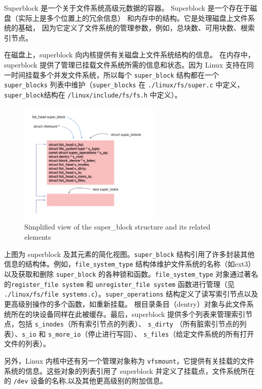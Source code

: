 \documentclass[UTF8,a4paper]{ctexart}
\begin{document}
Superblock 是一个关于文件系统高级元数据的容器。
Superblock
是一个存在于磁盘（实际上是多个位置上的冗余信息）
和内存中的结构。它是处理磁盘上文件系统的基础，
因为它定义了文件系统的管理参数，例如，总块数、可用块数、根索引节点。

在磁盘上，superblock
向内核提供有关磁盘上文件系统结构的信息。
在内存中，superblock
提供了管理已挂载文件系统所需的信息和状态。因为 Linux
支持在同一时间挂载多个并发文件系统，所以每个 \texttt{super\_block}
结构都在一个 \texttt{super\_blocks} 列表中维护（\texttt{super\_blocks}
在 \texttt{./linux/fs/super.c} 中定义，\texttt{super\_block}结构在
\texttt{/linux/include/fs/fs.h} 中定义）。

\begin{figure}[H]
    \centering
    \includegraphics[width=0.6\textwidth]{Simplified view of the super_block structure and its related elements.png}
    \caption{Simplified view of the super\_block structure and its related elements}
\end{figure}

上图为 superblock 及其元素的简化视图。\texttt{super\_block}
结构引用了许多封装其他信息的结构体。例如，\texttt{file\_system\_type}
结构体维护文件系统的名称（如ext3）以及获取和删除 \texttt{super\_block}
的各种锁和函数。\texttt{file\_system\_type}
对象通过著名的\texttt{register\_file\ system} 和
\texttt{unregister\_file\ system} 函数进行管理（见
\texttt{./linux/fs/file\ systems.c}）。\texttt{super\_operations}
结构定义了读写索引节点以及更高级别操作的多个函数，如重新挂载。
根目录条目（dentry）对象与此文件系统所在的块设备同样在此被缓存。最后，superblock
提供多个列表来管理索引节点，包括
\texttt{s\_inodes}（所有索引节点的列表）、
\texttt{s\_dirty}
（所有脏索引节点的列表）、\texttt{s\_io}
和
\texttt{s\_more\_io}（停止进行写回）、
\texttt{s\_files}（给定文件系统的所有打开文件的列表）。

另外，Linux 内核中还有另一个管理对象称为
\texttt{vfsmount}，它提供有关挂载的文件系统的信息。这些对象的列表引用了
superblock 并定义了挂载点，文件系统所在的 \texttt{/dev}
设备的名称,以及其他更高级别的附加信息。
\end{document}
